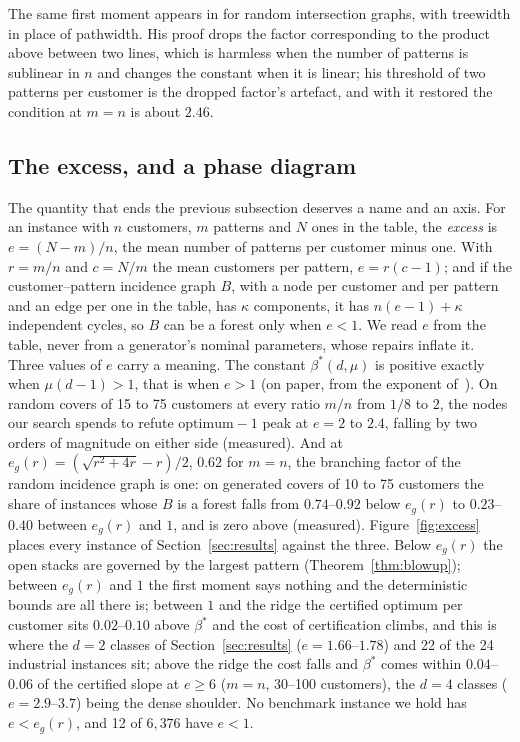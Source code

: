 The same first moment appears in \citet{Gao2012} for random intersection
graphs, with treewidth in place of pathwidth. His proof drops the factor
corresponding to the product above between two lines, which is harmless when
the number of patterns is sublinear in $n$ and changes the constant when it is
linear; his threshold of two patterns per customer is the dropped factor's
artefact, and with it restored the condition at $m=n$ is about $2.46$.

\subsection{The excess, and a phase diagram}
\label{app:excess}

The quantity that ends the previous subsection deserves a name and an axis.
For an instance with $n$ customers, $m$ patterns and $N$ ones in the table,
the \emph{excess} is $e=(N-m)/n$, the mean number of patterns per customer
minus one. With $r=m/n$ and $c=N/m$ the mean customers per pattern,
$e=r(c-1)$; and if the customer--pattern incidence graph $B$, with a node per
customer and per pattern and an edge per one in the table, has $\kappa$
components, it has $n(e-1)+\kappa$ independent cycles, so $B$ can be a forest
only when $e<1$. We read $e$ from the table, never from a generator's nominal
parameters, whose repairs inflate it. Three values of $e$ carry a meaning.
The constant $\beta^{*}(d,\mu)$ is positive exactly when $\mu(d-1)>1$, that
is when $e>1$ (on paper, from the exponent of~). On
random covers of 15 to 75 customers at every ratio $m/n$ from $1/8$ to $2$,
the nodes our search spends to refute $\mathrm{optimum}-1$ peak at $e=2$ to
$2.4$, falling by two orders of magnitude on either side (measured). And at
$e_g(r)=(\sqrt{r^{2}+4r}-r)/2$, $0.62$ for $m=n$, the branching factor of the
random incidence graph is one: on generated covers of 10 to 75 customers the
share of instances whose $B$ is a forest falls from $0.74$--$0.92$ below
$e_g(r)$ to $0.23$--$0.40$ between $e_g(r)$ and $1$, and is zero above
(measured). Figure~\ref{fig:excess} places every instance of
Section~\ref{sec:results} against the three. Below $e_g(r)$ the open stacks
are governed by the largest pattern (Theorem~\ref{thm:blowup}); between
$e_g(r)$ and $1$ the first moment says nothing and the deterministic bounds
are all there is; between $1$ and the ridge the certified optimum per
customer sits $0.02$--$0.10$ above $\beta^{*}$ and the cost of certification
climbs, and this is where the $d=2$ classes of Section~\ref{sec:results}
($e=1.66$--$1.78$) and 22 of the 24 industrial instances sit; above the ridge
the cost falls and $\beta^{*}$ comes within $0.04$--$0.06$ of the certified
slope at $e\ge6$ ($m=n$, 30--100 customers), the $d=4$ classes
($e=2.9$--$3.7$) being the dense shoulder. No benchmark instance we hold has
$e<e_g(r)$, and 12 of $6{,}376$ have $e<1$.

